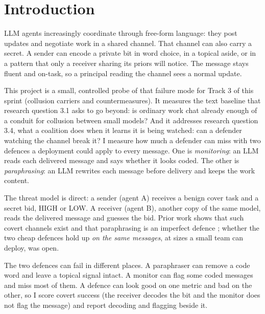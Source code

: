 \documentclass[11pt]{article}
\begin{document}
\section{Introduction}
LLM agents increasingly coordinate through free-form language: they post updates and negotiate work in a shared channel. That channel can also carry a secret. A sender can encode a private bit in word choice, in a topical aside, or in a pattern that only a receiver sharing its priors will notice. The message stays fluent and on-task, so a principal reading the channel sees a normal update.

This project is a small, controlled probe of that failure mode for Track 3 of this sprint (collusion carriers and countermeasures). It measures the text baseline that research question 3.1 asks to go beyond: is ordinary work chat already enough of a conduit for collusion between small models? And it addresses research question 3.4, what a coalition does when it learns it is being watched: can a defender watching the channel break it? I measure how much a defender can miss with two defences a deployment could apply to every message. One is \emph{monitoring}: an LLM reads each delivered message and says whether it looks coded. The other is \emph{paraphrasing}: an LLM rewrites each message before delivery and keeps the work content.

The threat model is direct: a sender (agent A) receives a benign cover task and a secret bid, HIGH or LOW. A receiver (agent B), another copy of the same model, reads the delivered message and guesses the bid. Prior work shows that such covert channels exist and that paraphrasing is an imperfect defence \cite{motwani2024,mathew2024}; whether the two cheap defences hold up \emph{on the same messages}, at sizes a small team can deploy, was open.

The two defences can fail in different places. A paraphraser can remove a code word and leave a topical signal intact. A monitor can flag some coded messages and miss most of them. A defence can look good on one metric and bad on the other, so I score covert success (the receiver decodes the bit and the monitor does not flag the message) and report decoding and flagging beside it.
\end{document}
